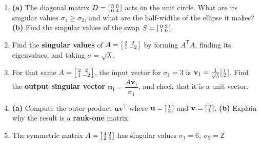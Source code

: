 \documentclass[10pt]{article}
\newcommand{\vv}{\mathbf{v}}
\newcommand{\uu}{\mathbf{u}}
\newcommand{\T}{^{\mathsf T}}
\begin{document}
\begin{enumerate}[leftmargin=1.9em, itemsep=12pt]
  \item \textbf{(a)} The diagonal matrix $D=\begin{bsmallmatrix}3&0\\0&4\end{bsmallmatrix}$ acts on the unit circle.
        What are its singular values $\sigma_1\ge\sigma_2$, and what are the half-widths of the ellipse it makes?
        \textbf{(b)} Find the singular values of the swap $S=\begin{bsmallmatrix}0&2\\1&0\end{bsmallmatrix}$.
        \vspace{2.4cm}
  \item Find the \textbf{singular values} of $A=\begin{bsmallmatrix}2&2\\1&-2\end{bsmallmatrix}$ by forming
        $A\T A$, finding its eigenvalues, and taking $\sigma=\sqrt{\lambda}$.
        \vspace{2.8cm}
  \item For that same $A=\begin{bsmallmatrix}2&2\\1&-2\end{bsmallmatrix}$, the input vector for $\sigma_1=3$ is
        $\vv_1=\tfrac{1}{\sqrt5}\begin{bsmallmatrix}1\\2\end{bsmallmatrix}$. Find the \textbf{output singular vector}
        $\uu_1=\dfrac{A\vv_1}{\sigma_1}$, and check that it is a unit vector.
        \vspace{2.8cm}
  \item \textbf{(a)} Compute the outer product $\uu\vv\T$ where $\uu=\begin{bsmallmatrix}1\\3\end{bsmallmatrix}$ and
        $\vv=\begin{bsmallmatrix}2\\1\end{bsmallmatrix}$. \textbf{(b)} Explain why the result is a \textbf{rank-one} matrix.
        \vspace{2.6cm}
  \item The symmetric matrix $A=\begin{bsmallmatrix}4&2\\2&4\end{bsmallmatrix}$ has singular values $\sigma_1=6,\ \sigma_2=2$

\end{enumerate}
\end{document}
